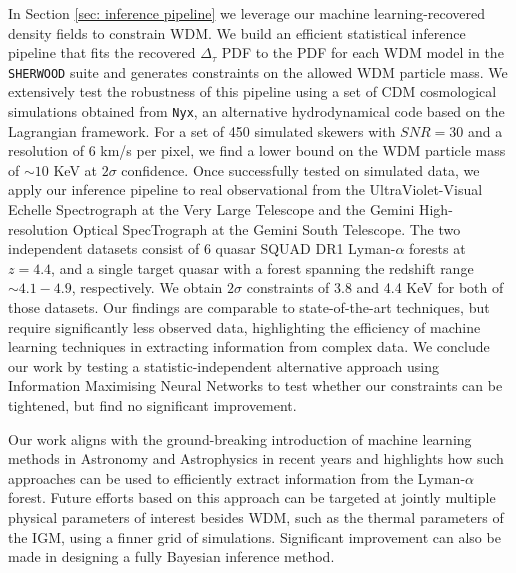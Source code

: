 In Section \ref{sec: inference pipeline} we leverage our machine learning-recovered density fields to constrain WDM. We build an efficient statistical inference pipeline that fits the recovered $\Delta_\tau$ PDF to the PDF for each WDM model in the \texttt{SHERWOOD} suite and generates constraints on the allowed WDM particle mass. We extensively test the robustness of this pipeline using a set of CDM cosmological simulations obtained from \texttt{Nyx}, an alternative hydrodynamical code based on the Lagrangian framework. For a set of 450 simulated skewers with $SNR=30$ and a resolution of $6$ km/s per pixel, we find a lower bound on the WDM particle mass of $\sim 10$ KeV at $2\sigma$ confidence. Once successfully tested on simulated data, we apply our inference pipeline to real observational from the UltraViolet-Visual Echelle Spectrograph at the Very Large Telescope and the Gemini High-resolution Optical SpecTrograph at the Gemini South Telescope. The two independent datasets consist of 6 quasar SQUAD DR1 Lyman-$\alpha$ forests at $z=4.4$, and a single target quasar with a forest spanning the redshift range $\sim 4.1-4.9$, respectively. We obtain $2\sigma$ constraints of 3.8 and 4.4 KeV for both of those datasets. Our findings are comparable to state-of-the-art techniques, but require significantly less observed data, highlighting the efficiency of machine learning techniques in extracting information from complex data. We conclude our work by testing a statistic-independent alternative approach using Information Maximising Neural Networks to test whether our constraints can be tightened, but find no significant improvement.

Our work aligns with the ground-breaking introduction of machine learning methods in Astronomy and Astrophysics in recent years and highlights how such approaches can be used to efficiently extract information from the Lyman-$\alpha$ forest. Future efforts based on this approach can be targeted at jointly multiple physical parameters of interest besides WDM, such as the thermal parameters of the IGM, using a finner grid of simulations. Significant improvement can also be made in designing a fully Bayesian inference method.